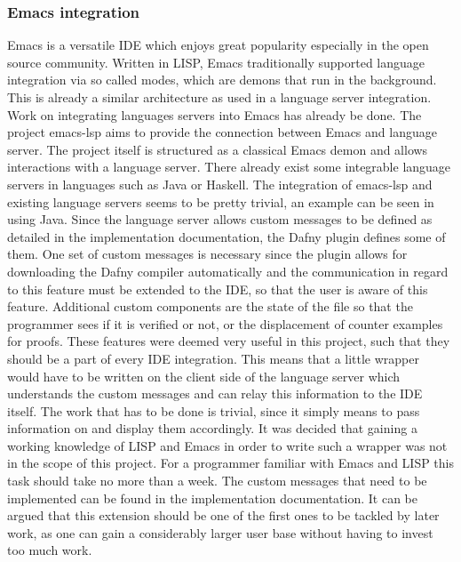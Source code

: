 \subsubsection{Emacs integration}
Emacs \cite{GNU} is a versatile IDE which enjoys great popularity especially in the open source community. Written in LISP, Emacs traditionally supported language integration via so called modes, which are demons that run in the background. This is already a similar architecture as used in a language server integration. \newline
Work on integrating languages servers into Emacs has already be done. The project emacs-lsp \cite{emacsLsp} aims to provide the connection between Emacs and language server. The project itself is structured as a classical Emacs demon and allows interactions with a language server. There already exist some integrable language servers in languages such as Java or Haskell. The integration of emacs-lsp and existing language servers seems to be pretty trivial, an example can be seen in \cite{javaEmacs} using Java. \newline
Since the language server allows custom messages to be defined as detailed in the implementation documentation, the Dafny plugin defines some of them. One set of custom messages is necessary since the plugin allows for downloading the Dafny compiler automatically and the communication in regard to this feature must be extended to the IDE, so that the user is aware of this feature. Additional custom components are the state of the file so that the programmer sees if it is verified or not, or the displacement of counter examples for proofs.\newline
These features were deemed very useful in this project, such that they should be a part of every IDE integration. This means that a little wrapper would have to be written on the client side of the language server which understands the custom messages and can relay this information to the IDE itself. The work that has to be done is trivial, since it simply means to pass information on and display them accordingly. \newline
It was decided that gaining a working knowledge of LISP and Emacs in order to write such a wrapper was not in the scope of this project. For a programmer familiar with Emacs and LISP this task should take no more than a week. The custom messages that need to be implemented can be found in the implementation documentation. It can be argued that this extension should be one of the first ones to be tackled by later work, as one can gain a considerably larger user base without having to invest too much work. 
